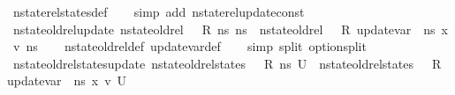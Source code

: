 \begin{isabellebody}
%
\isatagproof
{}\isamarkupfalse%
\ nstate{\isacharunderscore}{\kern0pt}rel{\isacharunderscore}{\kern0pt}states{\isacharunderscore}{\kern0pt}def\isanewline
\ \ \isamarkupfalse%
\ {\isacharparenleft}{\kern0pt}simp\ add{\isacharcolon}{\kern0pt}\ nstate{\isacharunderscore}{\kern0pt}rel{\isacharunderscore}{\kern0pt}update{\isacharunderscore}{\kern0pt}const{\isacharparenright}{\kern0pt}%
\endisatagproof
{\isafoldproof}%
%
\isadelimproof
\isanewline
%
\endisadelimproof
\isanewline
{}\isamarkupfalse%
\ nstate{\isacharunderscore}{\kern0pt}old{\isacharunderscore}{\kern0pt}rel{\isacharunderscore}{\kern0pt}update{\isacharcolon}{\kern0pt}\ {\isachardoublequoteopen}nstate{\isacharunderscore}{\kern0pt}old{\isacharunderscore}{\kern0pt}rel\ {\isasymLambda}\ {\isasymLambda}{\isacharprime}{\kern0pt}\ R\ ns{}\ ns{}\ {\isasymLongrightarrow}\ nstate{\isacharunderscore}{\kern0pt}old{\isacharunderscore}{\kern0pt}rel\ {\isasymLambda}\ {\isasymLambda}{\isacharprime}{\kern0pt}\ R\ {\isacharparenleft}{\kern0pt}update{\isacharunderscore}{\kern0pt}var\ {\isasymLambda}\ ns{}\ x\ v{\isacharparenright}{\kern0pt}\ ns{}{\isachardoublequoteclose}\isanewline
%
\isadelimproof
\ \ %
\endisadelimproof
%
\isatagproof
{}\isamarkupfalse%
\ nstate{\isacharunderscore}{\kern0pt}old{\isacharunderscore}{\kern0pt}rel{\isacharunderscore}{\kern0pt}def\ update{\isacharunderscore}{\kern0pt}var{\isacharunderscore}{\kern0pt}def\isanewline
\ \ \isamarkupfalse%
\ {\isacharparenleft}{\kern0pt}simp\ split{\isacharcolon}{\kern0pt}\ option{\isachardot}{\kern0pt}split{\isacharparenright}{\kern0pt}%
\endisatagproof
{\isafoldproof}%
%
\isadelimproof
\isanewline
%
\endisadelimproof
\isanewline
{}\isamarkupfalse%
\ nstate{\isacharunderscore}{\kern0pt}old{\isacharunderscore}{\kern0pt}rel{\isacharunderscore}{\kern0pt}states{\isacharunderscore}{\kern0pt}update{\isacharcolon}{\kern0pt}\ {\isachardoublequoteopen}nstate{\isacharunderscore}{\kern0pt}old{\isacharunderscore}{\kern0pt}rel{\isacharunderscore}{\kern0pt}states\ {\isasymLambda}\ {\isasymLambda}{\isacharprime}{\kern0pt}\ R\ ns{}\ U\ {\isasymLongrightarrow}\ nstate{\isacharunderscore}{\kern0pt}old{\isacharunderscore}{\kern0pt}rel{\isacharunderscore}{\kern0pt}states\ {\isasymLambda}\ {\isasymLambda}{\isacharprime}{\kern0pt}\ R\ {\isacharparenleft}{\kern0pt}update{\isacharunderscore}{\kern0pt}var\ {\isasymLambda}\ ns{}\ x\ v{\isacharparenright}{\kern0pt}\ U{\isachardoublequoteclose}\isanewline

\end{isabellebody}
